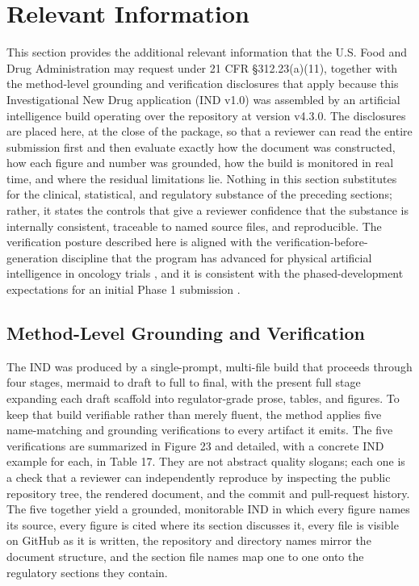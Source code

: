 \section{Relevant Information}

This section provides the additional relevant information that the U.S. Food and
Drug Administration may request under 21 CFR \S 312.23(a)(11), together with the
method-level grounding and verification disclosures that apply because this
Investigational New Drug application (IND v1.0) was assembled by an artificial
intelligence build operating over the repository at version v4.3.0. The
disclosures are placed here, at the close of the package, so that a reviewer can
read the entire submission first and then evaluate exactly how the document was
constructed, how each figure and number was grounded, how the build is monitored
in real time, and where the residual limitations lie. Nothing in this section
substitutes for the clinical, statistical, and regulatory substance of the
preceding sections; rather, it states the controls that give a reviewer
confidence that the substance is internally consistent, traceable to named source
files, and reproducible. The verification posture described here is aligned with
the verification-before-generation discipline that the program has advanced for
physical artificial intelligence in oncology trials \cite{congress9510,
clintrustpai}, and it is consistent with the phased-development expectations for
an initial Phase 1 submission \cite{phase1guidance}.

\subsection{Method-Level Grounding and Verification}

The IND was produced by a single-prompt, multi-file build that proceeds through
four stages, mermaid to draft to full to final, with the present full stage
expanding each draft scaffold into regulator-grade prose, tables, and figures.
To keep that build verifiable rather than merely fluent, the method applies five
name-matching and grounding verifications to every artifact it emits. The five
verifications are summarized in Figure 23 and detailed, with a concrete IND
example for each, in Table 17. They are not abstract quality slogans; each one is
a check that a reviewer can independently reproduce by inspecting the public
repository tree, the rendered document, and the commit and pull-request history.
The five together yield a grounded, monitorable IND in which every figure names
its source, every figure is cited where its section discusses it, every file is
visible on GitHub as it is written, the repository and directory names mirror the
document structure, and the section file names map one to one onto the regulatory
sections they contain.

